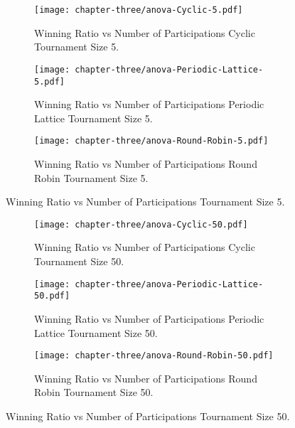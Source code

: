 \begin{figure}[H]
	\centering

	\begin{subfigure}[t]{0.75\textwidth}
		\centering
		\texttt{[image: chapter-three/anova-Cyclic-5.pdf]}
		\caption{Winning Ratio vs Number of Participations Cyclic Tournament Size 5.}
	\end{subfigure}
	\hfill
	\begin{subfigure}[t]{0.75\textwidth}\centering
		\centering
		\texttt{[image: chapter-three/anova-Periodic-Lattice-5.pdf]}
		\caption{Winning Ratio vs Number of Participations Periodic Lattice Tournament Size 5.}
	\end{subfigure}
	\hfill
	\begin{subfigure}[t]{0.75\textwidth}\centering
		\centering
		\texttt{[image: chapter-three/anova-Round-Robin-5.pdf]}
		\caption{Winning Ratio vs Number of Participations Round Robin Tournament Size 5.}
	\end{subfigure}
	\caption{Winning Ratio vs Number of Participations Tournament Size 5.}
	\label{fig:winning-ratio-participations-five}
\end{figure}

\begin{figure}[H]
	\centering

	\begin{subfigure}[t]{0.75\textwidth}
		\centering
		\texttt{[image: chapter-three/anova-Cyclic-50.pdf]}
		\caption{Winning Ratio vs Number of Participations Cyclic Tournament Size 50.}
	\end{subfigure}
	\hfill
	\begin{subfigure}[t]{0.75\textwidth}\centering
		\centering
		\texttt{[image: chapter-three/anova-Periodic-Lattice-50.pdf]}
		\caption{Winning Ratio vs Number of Participations Periodic Lattice Tournament Size 50.}
	\end{subfigure}
	\hfill
	\begin{subfigure}[t]{0.75\textwidth}\centering
		\centering
		\texttt{[image: chapter-three/anova-Round-Robin-50.pdf]}
		\caption{Winning Ratio vs Number of Participations Round Robin Tournament Size 50.}
	\end{subfigure}
	\caption{Winning Ratio vs Number of Participations Tournament Size 50.}
	\label{fig:winning-ratio-participations-fifty}
\end{figure}

